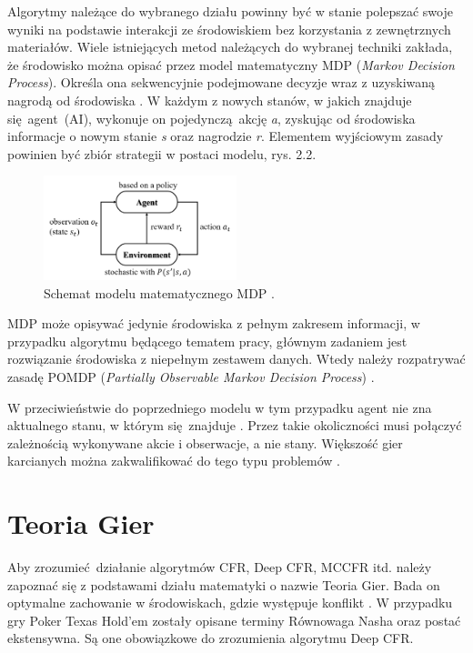 \documentclass[12pt,oneside,a4paper]{report}
\begin{document}
Algorytmy należące do
wybranego działu powinny być w stanie polepszać swoje wyniki na podstawie interakcji ze
środowiskiem bez korzystania z zewnętrznych materiałów.  
Wiele istniejących metod należących do wybranej techniki zakłada, że środowisko można opisać
przez model
matematyczny
MDP (\emph{Markov Decision Process}). 
Określa ona sekwencyjnie podejmowane decyzje wraz z uzyskiwaną nagrodą od środowiska \cite{mdp}. W każdym z nowych
stanów, w
jakich znajduje się agent (AI), wykonuje on pojedynczą akcję \emph{a}, 
zyskując od środowiska informacje o nowym stanie \emph{s}
oraz nagrodzie \emph{r}. Elementem wyjściowym zasady powinien być
zbiór strategii w postaci modelu, rys. 2.2.


\begin{figure}[th!]
            \center
           \includegraphics[width=0.5\textwidth]{./img/MDP.png}
           \caption{Schemat modelu matematycznego MDP \cite{mdp}.}
\end{figure}


MDP może opisywać jedynie środowiska z pełnym zakresem informacji, w przypadku algorytmu będącego
tematem pracy, głównym zadaniem jest rozwiązanie środowiska z niepełnym zestawem danych. Wtedy 
należy rozpatrywać zasadę POMDP (\emph{Partially Observable Markov Decision Process}) \cite{mdp}.


W przeciwieństwie do poprzedniego modelu w tym przypadku agent nie zna aktualnego stanu, w którym
się znajduje \cite{mdp}. Przez takie okoliczności musi połączyć zależnością wykonywane akcie i
obserwacje, a nie stany. Większość gier karcianych można zakwalifikować do tego typu problemów
\cite{mdp}.

\section{Teoria Gier}

Aby zrozumieć działanie algorytmów CFR, Deep CFR, MCCFR itd. należy zapoznać się
z podstawami działu matematyki o nazwie Teoria Gier. Bada on optymalne zachowanie w środowiskach, gdzie
występuje konflikt \cite{rn}. W przypadku gry Poker Texas
Hold'em zostały opisane terminy Równowaga Nasha oraz
postać ekstensywna. Są one obowiązkowe do zrozumienia algorytmu Deep CFR.
\end{document}
